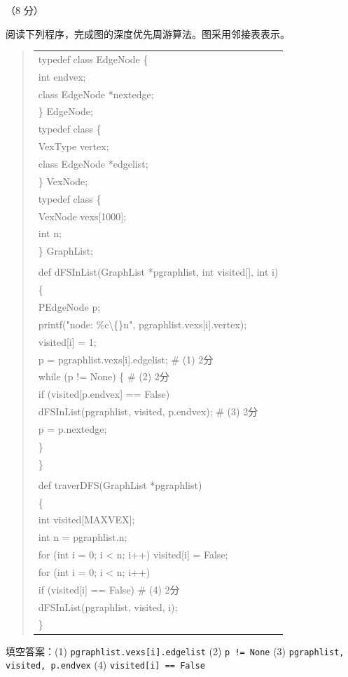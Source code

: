 \begin{question}[深度优先周游]（8 分）

阅读下列程序，完成图的深度优先周游算法。图采用邻接表表示。

\begin{quote}
\footnotesize
\begin{tabular}{@{}l@{}}
typedef class EdgeNode \{\\
    int endvex;\\
    class EdgeNode *nextedge;\\
\} EdgeNode;\\
typedef class \{\\
    VexType vertex;\\
    class EdgeNode *edgelist;\\
\} VexNode;\\
typedef class \{\\
    VexNode vexs[1000];\\
    int n;\\
\} GraphList;\\
\\
def dFSInList(GraphList *pgraphlist, int visited[], int i)\\
\{\\
    PEdgeNode p;\\
    printf("node: \%c\textbackslash\{\}n", pgraphlist.vexs[i].vertex);\\
    visited[i] = 1;\\
    p = pgraphlist.vexs[i].edgelist;           \# (1) 2分\\
    while (p != None) \{                          \# (2) 2分\\
        if (visited[p.endvex] == False)\\
            dFSInList(pgraphlist, visited, p.endvex);  \# (3) 2分\\
        p = p.nextedge;\\
    \}\\
\}\\
\\
def traverDFS(GraphList *pgraphlist)\\
\{\\
    int visited[MAXVEX];\\
    int n = pgraphlist.n;\\
    for (int i = 0; i < n; i++) visited[i] = False;\\
    for (int i = 0; i < n; i++)\\
        if (visited[i] == False)                 \# (4) 2分\\
            dFSInList(pgraphlist, visited, i);\\
\}\\
\end{tabular}
\end{quote}

\begin{solution}
填空答案：(1) \texttt{pgraphlist.vexs[i].edgelist} (2) \texttt{p != None} (3) \texttt{pgraphlist, visited, p.endvex} (4) \texttt{visited[i] == False}
\end{solution}
\end{question}

\clearpage
